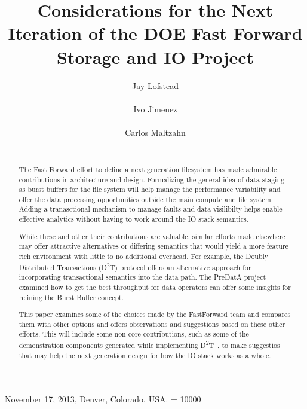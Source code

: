 \documentclass[conference]{sig-alt-gov2}
\newcommand{\DDT}{D\textsuperscript{2}T~}
\newcommand{\DDTns}{D\textsuperscript{2}T}
\begin{document}
 {November 17, 2013, Denver, Colorado, USA.}
\widowpenalty = 10000

\title{Considerations for the Next Iteration of the DOE Fast Forward Storage and IO Project}

\author{
\alignauthor Jay Lofstead\\
       \\
\alignauthor Ivo Jimenez\\
       \\
\alignauthor Carlos Maltzahn\\
       \\
}
\maketitle

\begin{abstract}
The Fast Forward effort to define a next generation filesystem has made
admirable contributions in architecture and design. Formalizing the general
idea of data staging as burst buffers for the file system will help manage
the performance variability and offer the data processing opportunities
outside the main compute and file system. Adding a tranasctional mechanism to
manage faults and data visilibilty helps enable effective analytics without
having to work around the IO stack semantics.

While these and other their contributions are valuable, similar efforts made
elsewhere may offer attractive alternatives or differing semantics that would
yield a more feature rich environment with little to no additional overhead.
For example, the Doubly Distributed Transactions (\DDTns) protocol offers an
alternative approach for incorporating transactional semantics into the data
path. The PreDatA project examined how to get the best throughput for data
operators can offer some insights for refining the Burst Buffer concept.

This paper examines some of the choices made by the FastForward team and
compares them with other options and offers observations and suggestions based
on these other efforts.  This will include some non-core contributions, such
as some of the demonstration components generated while implementing \DDT,
to make suggestios that may help the next generation design for how the IO
stack works as a whole.

\end{abstract}
\end{document}
